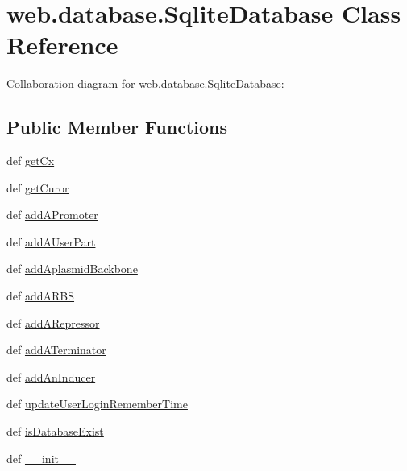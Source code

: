 \hypertarget{classweb_1_1database_1_1_sqlite_database}{\section{web.\-database.\-Sqlite\-Database Class Reference}
\label{classweb_1_1database_1_1_sqlite_database}
}


Collaboration diagram for web.\-database.\-Sqlite\-Database\-:
\subsection*{Public Member Functions}
\begin{DoxyCompactItemize}
\item 
def \hyperlink{classweb_1_1database_1_1_sqlite_database_ad2a7f19f35678292548e0393cd825183}{get\-Cx}
\item 
def \hyperlink{classweb_1_1database_1_1_sqlite_database_ab72f9cbafeb06d8cff21a475ccdbebe3}{get\-Curor}
\item 
def \hyperlink{classweb_1_1database_1_1_sqlite_database_a4093cd2060b23664f975837e3e2c4254}{add\-A\-Promoter}
\item 
def \hyperlink{classweb_1_1database_1_1_sqlite_database_a2a7d9ad306b7f3b4b565ac475ae5b1f4}{add\-A\-User\-Part}
\item 
def \hyperlink{classweb_1_1database_1_1_sqlite_database_ada2f619fce15f45b88b2d6731f76e01a}{add\-Aplasmid\-Backbone}
\item 
def \hyperlink{classweb_1_1database_1_1_sqlite_database_a142721418384bd5c28a3a297e26b3982}{add\-A\-R\-B\-S}
\item 
def \hyperlink{classweb_1_1database_1_1_sqlite_database_ac5916b100f59267d3b82b091049dd339}{add\-A\-Repressor}
\item 
def \hyperlink{classweb_1_1database_1_1_sqlite_database_a6d3c408fa37da3818ff89638459ef173}{add\-A\-Terminator}
\item 
def \hyperlink{classweb_1_1database_1_1_sqlite_database_a0862c033c1cc6a19ec4434f5277aa0fd}{add\-An\-Inducer}
\item 
def \hyperlink{classweb_1_1database_1_1_sqlite_database_af2e6bb04f7b3dda731675513008a8bbd}{update\-User\-Login\-Remember\-Time}
\item 
def \hyperlink{classweb_1_1database_1_1_sqlite_database_a69bdd16ba96ab16a65004e593ae80428}{is\-Database\-Exist}
\item 
def \hyperlink{classweb_1_1database_1_1_sqlite_database_afcef92fc58cf542486b4772895a22aa3}{\-\_\-\-\_\-init\-\_\-\-\_\-}

\end{DoxyCompactItemize}
